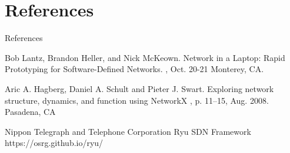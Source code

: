 \documentclass{beamer}
\begin{document}
\section{References}
\begin{frame}{References}
\begin{thebibliography}{Schroeder, 1991}
\footnotesize
{}
  Bob Lantz, Brandon Heller, and Nick McKeown.
  \newblock Network in a Laptop: Rapid Prototyping for
            Software-Defined Networks.
  , Oct. 20-21
  \newblock Monterey, CA.
  
  Aric A. Hagberg, Daniel A. Schult and Pieter J. Swart.
  \newblock Exploring network structure, dynamics, and function using NetworkX
  , p. 11--15, Aug. 2008.
  \newblock Pasadena, CA
  
  Nippon Telegraph and Telephone Corporation
  \newblock Ryu SDN Framework
  \newblock https://osrg.github.io/ryu/ 
\end{thebibliography}
\end{frame}
\end{document}
